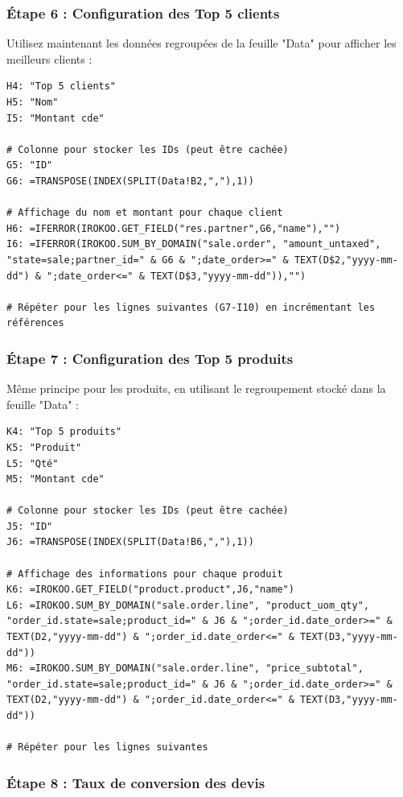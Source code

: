 \documentclass[12pt, a4paper]{article}
\begin{document}
\subsubsection{Étape 6 : Configuration des Top 5 clients}

Utilisez maintenant les données regroupées de la feuille "Data" pour afficher les meilleurs clients :

\begin{lstlisting}
H4: "Top 5 clients"
H5: "Nom"
I5: "Montant cde"

# Colonne pour stocker les IDs (peut être cachée)
G5: "ID"
G6: =TRANSPOSE(INDEX(SPLIT(Data!B2,","),1))

# Affichage du nom et montant pour chaque client
H6: =IFERROR(IROKOO.GET_FIELD("res.partner",G6,"name"),"")
I6: =IFERROR(IROKOO.SUM_BY_DOMAIN("sale.order", "amount_untaxed", "state=sale;partner_id=" & G6 & ";date_order>=" & TEXT(D$2,"yyyy-mm-dd") & ";date_order<=" & TEXT(D$3,"yyyy-mm-dd")),"")

# Répéter pour les lignes suivantes (G7-I10) en incrémentant les références
\end{lstlisting}

\subsubsection{Étape 7 : Configuration des Top 5 produits}

Même principe pour les produits, en utilisant le regroupement stocké dans la feuille "Data" :

\begin{lstlisting}
K4: "Top 5 produits"
K5: "Produit"
L5: "Qté"
M5: "Montant cde"

# Colonne pour stocker les IDs (peut être cachée)
J5: "ID"
J6: =TRANSPOSE(INDEX(SPLIT(Data!B6,","),1))

# Affichage des informations pour chaque produit
K6: =IROKOO.GET_FIELD("product.product",J6,"name")
L6: =IROKOO.SUM_BY_DOMAIN("sale.order.line", "product_uom_qty", "order_id.state=sale;product_id=" & J6 & ";order_id.date_order>=" & TEXT(D2,"yyyy-mm-dd") & ";order_id.date_order<=" & TEXT(D3,"yyyy-mm-dd"))
M6: =IROKOO.SUM_BY_DOMAIN("sale.order.line", "price_subtotal", "order_id.state=sale;product_id=" & J6 & ";order_id.date_order>=" & TEXT(D2,"yyyy-mm-dd") & ";order_id.date_order<=" & TEXT(D3,"yyyy-mm-dd"))

# Répéter pour les lignes suivantes
\end{lstlisting}

\subsubsection{Étape 8 : Taux de conversion des devis}
\end{document}
